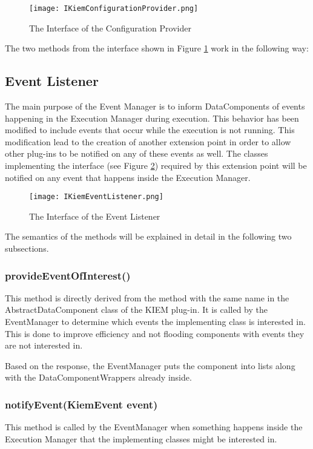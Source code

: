\begin{figure}[Configuration Provider Interface]
  \centering
  \texttt{[image: IKiemConfigurationProvider.png]}
  \caption[The Interface of the Configuration Provider]%
  {The Interface of the Configuration Provider\protect}
  \label{fig:UMLConfigurationProvider}
\end{figure}

The two methods from the interface shown in Figure \ref{fig:UMLConfigurationProvider} work
in the following way:

\subsection{Event Listener}
\label{section:EventListener}
The main purpose of the Event Manager is to inform DataComponents of events
happening in the Execution Manager during execution. This behavior has been modified to include 
events that occur while the execution is not running. This modification lead to the 
creation of another extension point in order to allow other plug-ins to be notified
on any of these events as well. The classes implementing the interface 
(see Figure \ref{fig:UMLEventListener}) required by this extension point will be notified
on any event that happens inside the Execution Manager.

\begin{figure}[Event Listener Interface]
  \centering
  \texttt{[image: IKiemEventListener.png]}
  \caption[The Interface of the Event Listener]%
  {The Interface of the Event Listener\protect}
  \label{fig:UMLEventListener}
\end{figure}

The semantics of the methods will be explained in detail in the following two subsections.

\subsubsection*{provideEventOfInterest()}
This method is directly derived from the method with the same name in the AbstractDataComponent class
of the \ac{KIEM} plug-in. It is called by the EventManager to determine which events the implementing
class is interested in. This is done to improve efficiency and not flooding components with events
they are not interested in.

Based on the response, the EventManager puts the component into lists along with the DataComponentWrappers
already inside.
\subsubsection*{notifyEvent(KiemEvent event)}
This method is called by the EventManager when something happens inside the Execution Manager that the implementing
classes might be interested in.


